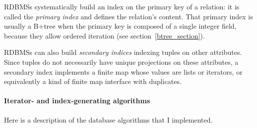 \documentclass[11pt]{article}
\begin{document}
RDBMSs systematically build an index on the primary key of a relation: it is called the \emph{primary index} and defines the relation's content.
That primary index is usually a B+tree when the primary key is composed of a single integer field, because they allow ordered iteration (see section~\ref{btree_section}).

RDBMSs can also build \emph{secondary indices} indexing tuples on other attributes.
Since tuples do not necessarily have unique projections on these attributes,
a secondary index implements a finite map whose values are lists or iterators,
or equivalently a kind of finite map interface with duplicates.

\paragraph{Iterator- and index-generating algorithms}
Here is a description of the database algorithms that I implemented.
\end{document}
